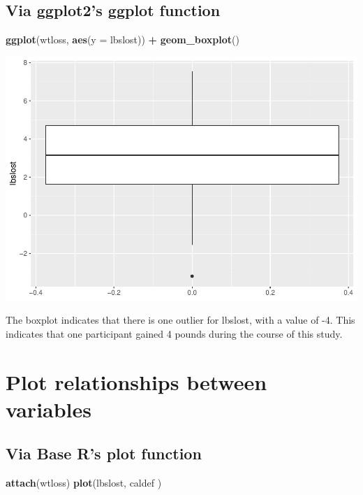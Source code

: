 \documentclass[]{article}
\newenvironment{Shaded}{\begin{snugshade}}{\end{snugshade}}
\newcommand{\KeywordTok}[1]{\textcolor[rgb]{0.13,0.29,0.53}{\textbf{#1}}}
\newcommand{\DataTypeTok}[1]{\textcolor[rgb]{0.13,0.29,0.53}{#1}}
\newcommand{\StringTok}[1]{\textcolor[rgb]{0.31,0.60,0.02}{#1}}
\newcommand{\OperatorTok}[1]{\textcolor[rgb]{0.81,0.36,0.00}{\textbf{#1}}}
\newcommand{\NormalTok}[1]{#1}
\begin{document}
\subsection{Via ggplot2's ggplot
function}\label{via-ggplot2s-ggplot-function}

\begin{Shaded}
\begin{Highlighting}[]
\KeywordTok{ggplot}\NormalTok{(wtloss, }\KeywordTok{aes}\NormalTok{(}\DataTypeTok{y =}\NormalTok{ lbslost)) }\OperatorTok{+}
\StringTok{  }\KeywordTok{geom_boxplot}\NormalTok{()}
\end{Highlighting}
\end{Shaded}

\includegraphics{wtloss_notebook_files/figure-latex/unnamed-chunk-7-1.pdf}

The boxplot indicates that there is one outlier for lbslost, with a
value of -4. This indicates that one participant gained 4 pounds during
the course of this study.

\section{Plot relationships between
variables}\label{plot-relationships-between-variables}

\subsection{Via Base R's plot function}\label{via-base-rs-plot-function}

\begin{Shaded}
\begin{Highlighting}[]
\KeywordTok{attach}\NormalTok{(wtloss)}
\KeywordTok{plot}\NormalTok{(lbslost, caldef )}
\end{Highlighting}
\end{Shaded}
\end{document}
